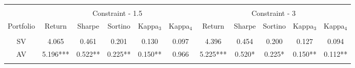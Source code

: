 \begin{tabular}{@{\extracolsep{5pt}} ccccccccccc} 
\hline \\[-1.8ex] 
& \multicolumn{5}{c}{Constraint - 1.5} &\multicolumn{5}{c}{Constraint - 3}\\
\cline{2-6} \cline{7-11}
Portfolio & Return & Sharpe & Sortino & Kappa$_{3}$ & Kappa$_{4}$ & Return & Sharpe & Sortino & Kappa$_{3}$ & Kappa$_{4}$ \\ 
\hline \\[-1.8ex] 
SV & 4.065 & 0.461 & 0.201 & 0.130 & 0.097 & 4.396 & 0.454 & 0.200 & 0.127 & 0.094 \\ 
AV & 5.196*** & 0.522** & 0.225** & 0.150** & 0.966 & 5.225*** & 0.520* & 0.225* & 0.150** & 0.112** \\ 
\hline\\
\end{tabular}